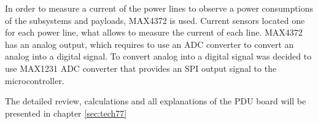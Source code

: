   In order to measure a current of the power lines to observe a power consumptions of the subsystems and payloads, MAX4372 is used. Current sensors located one for each power line, what allows to measure the current of each line. MAX4372 has an analog output, which requires to use an ADC converter to convert an analog into a digital signal. To convert analog into a digital signal was decided to use MAX1231 ADC converter that provides an SPI output signal to the microcontroller. 
  
    
  The detailed review, calculations and all explanations of the PDU board will be presented in chapter \ref{sec:tech77}
  
    
  
    

    
  

  
  
  

